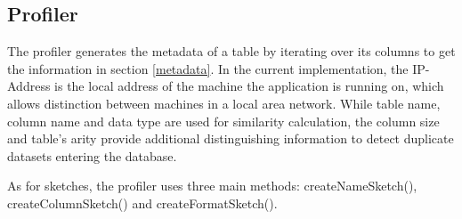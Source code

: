 \subsection{Profiler}\label{profiler}

The profiler generates the metadata of a table by iterating over its columns to get the information in section \ref{metadata}. In the current implementation, the IP-Address is the local address of the machine the application is running on, which allows distinction between machines in a local area network. While table name, column name and data type are used for similarity calculation, the column size and table's arity provide additional distinguishing information to detect duplicate datasets entering the database.

As for sketches, the profiler uses three main methods: createNameSketch(), createColumnSketch() and createFormatSketch().

